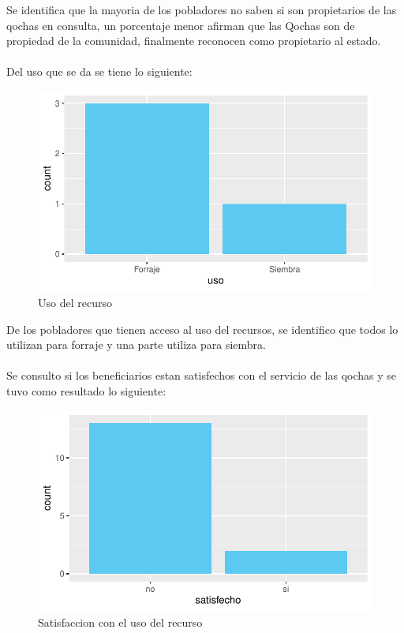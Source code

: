 \documentclass[12pt]{article}\usepackage[]{graphicx}\usepackage[]{xcolor}
\makeatletter
\def\maxwidth{ %
  \ifdim\Gin@nat@width>\linewidth
    \linewidth
  \else
    \Gin@nat@width
  \fi
}
\newenvironment{knitrout}{}{} %
\makeatother
\begin{document}
	Se identifica que la mayoria de los pobladores no saben si son propietarios de las qochas en consulta, un porcentaje menor afirman que las Qochas son de propiedad de la comunidad, finalmente reconocen como propietario al estado.\\
	\\
	Del uso que se da se tiene lo siguiente:
	\begin{figure}[H]
	\centering
\begin{knitrout}
\color{fgcolor}
\includegraphics[width=\maxwidth]{figure/quince-1} 
\end{knitrout}
	\caption{Uso del recurso}
	\end{figure}
	De los pobladores que tienen acceso al uso del recursos, se identifico que todos lo utilizan para forraje y una parte utiliza para siembra.\\
	\\
	Se consulto si los beneficiarios estan satisfechos con el servicio de las qochas y se tuvo como resultado lo siguiente:
	\begin{figure}[H]
	\centering
\begin{knitrout}
\color{fgcolor}
\includegraphics[width=\maxwidth]{figure/dieciseis-1} 
\end{knitrout}
	\caption{Satisfaccion con el uso del recurso}
	\end{figure}
\end{document}
